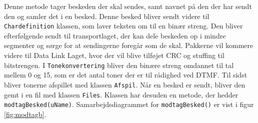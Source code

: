 \hfill \break
Denne metode tager beskeden der skal sendes, samt navnet på den der har sendt den og samler det i en besked. Denne besked bliver sendt videre til \texttt{Chardefinition} klassen, som laver teksten om til en binær streng. Den bliver efterfølgende sendt til transportlaget, der kan dele beskeden op i mindre segmenter og sørge for at sendingerne foregår som de skal. Pakkerne vil kommere videre til Data Link Laget, hvor der vil blive tilføjet CRC og stuffing til bitstrengen. I \texttt{Tonekonvertering} bliver den binære streng omdannet til tal mellem 0 og 15, som er det antal toner der er til rådighed ved DTMF. Til sidst bliver tonerne afspillet med klassen \texttt{Afspil}. Når en besked er sendt, bliver den gemt i en fil med klassen \texttt{Files}.
\newline
Klassen har desuden en metode, der hedder \texttt{modtagBesked(uName)}. Samarbejdsdiagrammet for \texttt{modtagBesked()} er vist i figur \ref{fig:modtagb}.
